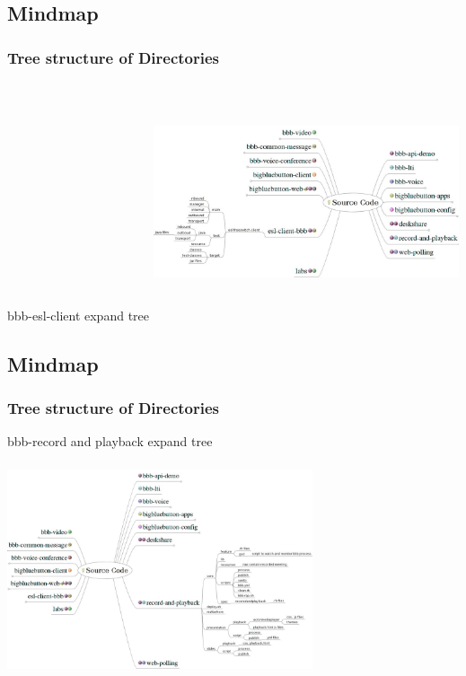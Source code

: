 \documentclass{beamer}
\begin{document}
\subsection*{Mindmap}
\begin{frame}
\frametitle{Tree structure of Directories}
{bbb-esl-client expand tree}
\includegraphics[height=70mm,width=90mm]{./images/SourceCode12.jpeg}
\end{frame}


\subsection*{Mindmap}
\begin{frame}
\frametitle{Tree structure of Directories}
{bbb-record and playback expand tree}
\includegraphics[height=70mm,width=90mm]{./images/SourceCode13.jpeg}
\end{frame}
\end{document}
